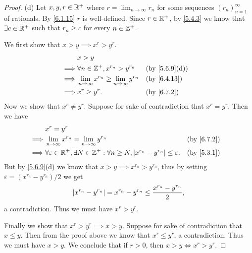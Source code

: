 \begin{proof}{(d)}
  Let \(x, y, r \in \mathbb{R}^+\) where \(r = \lim_{n \to \infty} r_n\) for some sequences \((r_n)_{n = 1}^\infty\) of rationals.
  By \cref{6.1.15} \(r\) is well-defined.
  Since \(r \in \mathbb{R}^+\), by \cref{5.4.3} we know that \(\exists c \in \mathbb{R}^+\) such that \(r_n \geq c\) for every \(n \in \mathbb{Z}^+\).

  We first show that \(x > y \implies x^r > y^r\).
  \begin{align*}
             & x > y                                                                                         \\
    \implies & \forall n \in \Z^+, x^{r_n} > y^{r_n}                        &  & \text{(by \cref{5.6.9}(d))} \\
    \implies & \lim_{n \to \infty} x^{r_n} \geq \lim_{n \to \infty} y^{r_n} &  & \by{6.4.13}                 \\
    \implies & x^r \geq y^r.                                                &  & \by{6.7.2}
  \end{align*}
  Now we show that \(x^r \neq y^r\).
  Suppose for sake of contradiction that \(x^r = y^r\).
  Then we have
  \begin{align*}
             & x^r = y^r                                                                                                                      \\
    \implies & \lim_{n \to \infty} x^{r_n} = \lim_{n \to \infty} y^{r_n}                                                      &  & \by{6.7.2} \\
    \implies & \forall \varepsilon \in \R^+, \exists N \in \Z^+ : \forall n \geq N, \abs{x^{r_n} - y^{r_n}} \leq \varepsilon. &  & \by{5.3.1}
  \end{align*}
  But by \cref{5.6.9}(d) we know that \(x > y \implies x^{r_n} > y^{r_n}\), thus by setting \(\varepsilon = (x^{r_n} - y^{r_n}) / 2\) we get
  \[
    \left\lvert x^{r_n} - y^{r_n}\right\rvert = x^{r_n} - y^{r_n} \leq \dfrac{x^{r_n} - y^{r_n}}{2},
  \]
  a contradiction.
  Thus we must have \(x^r > y^r\).

  Finally we show that \(x^r > y^r \implies x > y\).
  Suppose for sake of contradiction that \(x \leq y\).
  Then from the proof above we know that \(x^r \leq y^r\), a contradiction.
  Thus we must have \(x > y\).
  We conclude that if \(r > 0\), then \(x > y \iff x^r > y^r\).
\end{proof}


